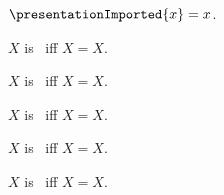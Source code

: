 \begin{definition}\label{presentation_imported}
    $\presentationImported{x}=x$.
\end{definition}

\begin{abbreviation}\label{teezero}
    $X$ is \teezero\ iff $X=X$.
\end{abbreviation}

\begin{abbreviation}\label{teeone}
    $X$ is \teeone\ iff $X=X$.
\end{abbreviation}

\begin{abbreviation}\label{teetwo}
    $X$ is \teetwo\ iff $X=X$.
\end{abbreviation}

\begin{abbreviation}\label{teethree}
    $X$ is \teethree\ iff $X=X$.
\end{abbreviation}

\begin{abbreviation}\label{teefour}
    $X$ is \teefour\ iff $X=X$.
\end{abbreviation}
